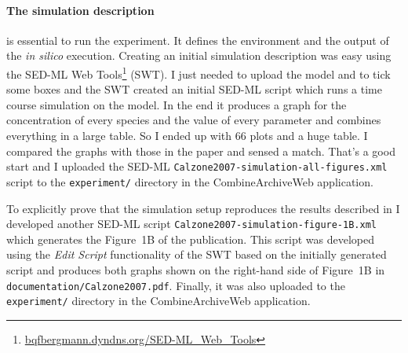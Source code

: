 \paragraph{The simulation description} is essential to run the experiment.
It defines the environment and the output of the \textit{in silico} execution.
Creating an initial simulation description was easy using the SED-ML Web Tools\footnote{\href{http://bqfbergmann.dyndns.org/SED-ML_Web_Tools}{bqfbergmann.dyndns.org/SED-ML\_Web\_Tools}} (SWT).
I just needed to upload the model and to tick some boxes and the SWT created an initial SED-ML script which runs a time course simulation on the model.
In the end it produces a graph for the concentration of every species and the value of every parameter and combines everything in a large table.
So I ended up with 66 plots and a huge table.
I compared the graphs with those in the paper and sensed a match.
That's a good start and I uploaded the SED-ML \texttt{Calzone2007-simulation-all-figures.xml} script to the \texttt{experiment/} directory in the CombineArchiveWeb application.

To explicitly prove that the simulation setup reproduces the results described in \cite{Calzone2007} I developed another SED-ML script \texttt{Calzone2007-simulation-figure-1B.xml} which generates the Figure~1B of the publication.
This script was developed using the \textit{Edit Script} functionality of the SWT based on the initially generated script and produces both graphs shown on the right-hand side of Figure~1B in \texttt{documentation/Calzone2007.pdf}.
Finally, it was also uploaded to the \texttt{experiment/} directory in the CombineArchiveWeb application.




